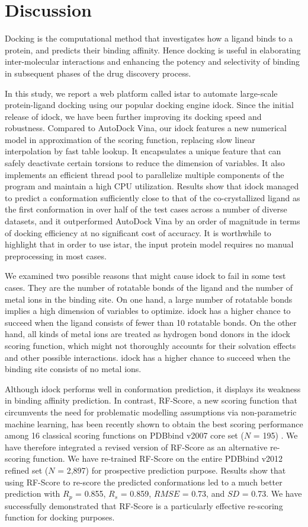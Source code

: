 \section{Discussion}

Docking is the computational method that investigates how a ligand binds to a protein, and predicts their binding affinity. Hence docking is useful in elaborating inter-molecular interactions and enhancing the potency and selectivity of binding in subsequent phases of the drug discovery process.

In this study, we report a web platform called istar to automate large-scale protein-ligand docking using our popular docking engine idock. Since the initial release of idock, we have been further improving its docking speed and robustness. Compared to AutoDock Vina, our idock features a new numerical model in approximation of the scoring function, replacing slow linear interpolation by fast table lookup. It encapsulates a unique feature that can safely deactivate certain torsions to reduce the dimension of variables. It also implements an efficient thread pool to parallelize multiple components of the program and maintain a high CPU utilization. Results show that idock managed to predict a conformation sufficiently close to that of the co-crystallized ligand as the first conformation in over half of the test cases across a number of diverse datasets, and it outperformed AutoDock Vina by an order of magnitude in terms of docking efficiency at no significant cost of accuracy. It is worthwhile to highlight that in order to use istar, the input protein model requires no manual preprocessing in most cases.

We examined two possible reasons that might cause idock to fail in some test cases. They are the number of rotatable bonds of the ligand and the number of metal ions in the binding site. On one hand, a large number of rotatable bonds implies a high dimension of variables to optimize. idock has a higher chance to succeed when the ligand consists of fewer than 10 rotatable bonds. On the other hand, all kinds of metal ions are treated as hydrogen bond donors in the idock scoring function, which might not thoroughly accounts for their solvation effects and other possible interactions. idock has a higher chance to succeed when the binding site consists of no metal ions.

Although idock performs well in conformation prediction, it displays its weakness in binding affinity prediction. In contrast, RF-Score, a new scoring function that circumvents the need for problematic modelling assumptions via non-parametric machine learning, has been recently shown to obtain the best scoring performance among 16 classical scoring functions on PDBbind v2007 core set ($N$ = 195) \citep{564}. We have therefore integrated a revised version of RF-Score as an alternative re-scoring function. We have re-trained RF-Score on the entire PDBbind v2012 refined set ($N$ = 2,897) for prospective prediction purpose. Results show that using RF-Score to re-score the predicted conformations led to a much better prediction with $R_p$ = 0.855, $R_s$ = 0.859, $RMSE$ = 0.73, and $SD$ = 0.73. We have successfully demonstrated that RF-Score is a particularly effective re-scoring function for docking purposes.

